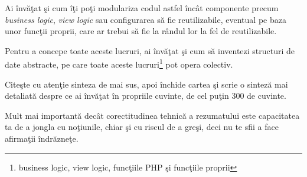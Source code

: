 Ai învăţat şi cum îţi poţi modulariza codul astfel încât componente
precum \textit{business logic}, \textit{view logic} sau configurarea să fie
reutilizabile, eventual pe baza unor funcţii proprii, care ar
trebui să fie la rândul lor la fel de reutilizabile.

Pentru a concepe toate aceste lucruri, ai învăţat şi cum să inventezi
structuri de date abstracte, pe care toate aceste
lucruri\footnote{business logic, view logic, funcţiile PHP şi
funcţiile proprii} pot opera colectiv.

\begin{Exercise}[title={Recapitulare şi sinteză}]
Citeşte cu atenţie sinteza de mai sus, apoi închide cartea şi scrie o
sinteză mai detaliată despre ce ai învăţat în propriile cuvinte,
de cel puţin 300 de cuvinte.

Mult mai importantă dec\^at corectitudinea tehnică a rezumatului
este capacitatea ta de a jongla cu noţiunile, chiar şi cu
riscul de a greşi, deci nu te sfii a face afirmaţii \^indrăzneţe.
\end{Exercise}
